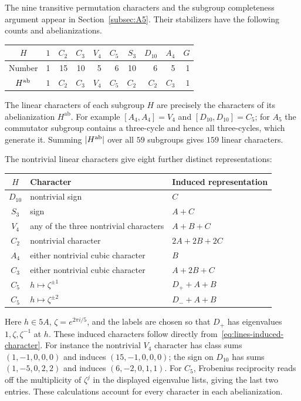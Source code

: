 \documentclass[11pt,a4paper]{article}
\begin{document}
The nine transitive permutation characters and the subgroup completeness argument appear in Section~\ref{subsec:A5}. Their stabilizers have the following counts and abelianizations.
\begin{center}
\begin{tabular}{c|rrrrrrrrr}
$H$&$1$&$C_2$&$C_3$&$V_4$&$C_5$&$S_3$&$D_{10}$&$A_4$&$G$\\\hline
Number&1&15&10&5&6&10&6&5&1\\
$H^{\rm ab}$&$1$&$C_2$&$C_3$&$V_4$&$C_5$&$C_2$&$C_2$&$C_3$&$1$
\end{tabular}
\end{center}
The linear characters of each subgroup $H$ are precisely the characters of its abelianization $H^{\mathrm{ab}}$. For example $[A_4,A_4]=V_4$ and $[D_{10},D_{10}]=C_5$; for $A_5$ the commutator subgroup contains a three-cycle and hence all three-cycles, which generate it. Summing $|H^{\rm ab}|$ over all $59$ subgroups gives $159$ linear characters.

The nontrivial linear characters give eight further distinct representations:
\begin{center}\small
\begin{tabular}{cll}
\toprule
$H$&Character&Induced representation\\\midrule
$D_{10}$&nontrivial sign&$C$\\
$S_3$&sign&$A+C$\\
$V_4$&any of the three nontrivial characters&$A+B+C$\\
$C_2$&nontrivial character&$2A+2B+2C$\\
$A_4$&either nontrivial cubic character&$B$\\
$C_3$&either nontrivial cubic character&$A+2B+C$\\
$C_5$&$h\mapsto\zeta^{\pm1}$&$D_++A+B$\\
$C_5$&$h\mapsto\zeta^{\pm2}$&$D_-+A+B$\\\bottomrule
\end{tabular}\end{center}
Here $h\in5A$, $\zeta=e^{2\pi i/5}$, and the labels are chosen so that $D_+$ has eigenvalues $1,\zeta,\zeta^{-1}$ at $h$. These induced characters follow directly from~\eqref{eq:lines-induced-character}. For instance the nontrivial $V_4$ character has class sums $(1,-1,0,0,0)$ and induces $(15,-1,0,0,0)$; the sign on $D_{10}$ has sums $(1,-5,0,2,2)$ and induces $(6,-2,0,1,1)$. For $C_5$, Frobenius reciprocity reads off the multiplicity of $\zeta^j$ in the displayed eigenvalue lists, giving the last two entries. These calculations account for every character in each abelianization.
\end{document}
